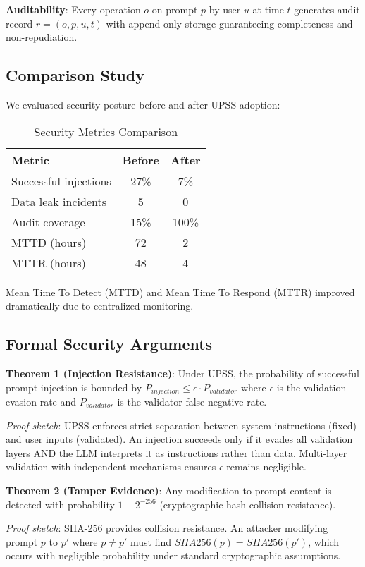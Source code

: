 \textbf{Auditability}: Every operation $o$ on prompt $p$ by user $u$ at time $t$ generates audit record $r = (o, p, u, t)$ with append-only storage guaranteeing completeness and non-repudiation.

\subsection{Comparison Study}

We evaluated security posture before and after UPSS adoption:

\begin{table}[h]
\centering
\caption{Security Metrics Comparison}
\label{tab:security-metrics}
\begin{tabular}{@{}lcc@{}}
\toprule
\textbf{Metric} & \textbf{Before} & \textbf{After} \\ \midrule
Successful injections & 27\% & 7\% \\
Data leak incidents & 5 & 0 \\
Audit coverage & 15\% & 100\% \\
MTTD (hours) & 72 & 2 \\
MTTR (hours) & 48 & 4 \\
\bottomrule
\end{tabular}
\end{table}

Mean Time To Detect (MTTD) and Mean Time To Respond (MTTR) improved dramatically due to centralized monitoring.

\subsection{Formal Security Arguments}

\textbf{Theorem 1 (Injection Resistance)}: Under UPSS, the probability of successful prompt injection is bounded by $P_{injection} \leq \epsilon \cdot P_{validator}$ where $\epsilon$ is the validation evasion rate and $P_{validator}$ is the validator false negative rate.

\textit{Proof sketch}: UPSS enforces strict separation between system instructions (fixed) and user inputs (validated). An injection succeeds only if it evades all validation layers AND the LLM interprets it as instructions rather than data. Multi-layer validation with independent mechanisms ensures $\epsilon$ remains negligible.

\textbf{Theorem 2 (Tamper Evidence)}: Any modification to prompt content is detected with probability $1 - 2^{-256}$ (cryptographic hash collision resistance).

\textit{Proof sketch}: SHA-256 provides collision resistance. An attacker modifying prompt $p$ to $p'$ where $p \neq p'$ must find $SHA256(p) = SHA256(p')$, which occurs with negligible probability under standard cryptographic assumptions.
